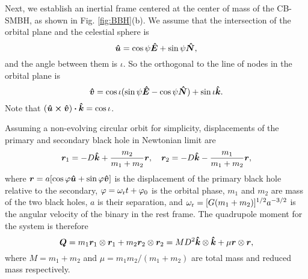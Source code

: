 \documentclass[times,tight]{aastex631}
\begin{document}
Next, we establish an inertial frame centered at the center of mass of the CB-SMBH, as shown in Fig. \ref{fig:BBH}(b).
We assume that the intersection of the orbital plane and the celestial sphere is
\begin{equation}
    \vu*{u} = \cos{\psi}\vu*{E} + \sin{\psi}\vu*{N},
\end{equation}
and the angle between them is $\iota$.
So the orthogonal to the line of nodes in the orbital plane is
\begin{equation}
    \vu*{v} = \cos \iota (\sin\psi\vu*{E} - \cos{\psi}\vu*{N}) + \sin \iota \vu*{k}.
\end{equation}
Note that $(\vu*{u} \cp \vu*{v})\vdot\vu*{k} = \cos\iota$.

Assuming a non-evolving circular orbit for simplicity, displacements of the primary and secondary black hole in Newtonian limit are
\begin{equation}
    \bm{r}_1 = -D \vu*{k} + \frac{m_2}{m_1+m_2} \bm{r} \qc \bm{r}_2 = -D \vu*{k} - \frac{m_1}{m_1+m_2} \bm{r},
\end{equation}
where $\bm{r} = a [\cos\varphi \vu*{u} + \sin\varphi \vu*{v}]$ is the displacement of the primary black hole relative to the secondary, $\varphi = \omega_{\rm r} t+\varphi_0$ is the orbital phase, $m_1$ and $m_2$ are mass of the two black holes, $a$ is their separation, and $\omega_{\rm r} = [G(m_1+m_2)]^{1/2}a^{-3/2}$ is the angular velocity of the binary in the rest frame.
The quadrupole moment for the system is therefore
\begin{equation}
    \bm{Q} = m_1 \bm{r}_1 \otimes \bm{r}_1 + m_2 \bm{r}_2 \otimes \bm{r}_2
    = MD^2 \vu*{k}\otimes\vu*{k} + \mu \bm{r}\otimes\bm{r},
\end{equation}
where $M=m_1+m_2$ and $\mu=m_1m_2/(m_1+m_2)$ are total mass and reduced mass respectively.
\end{document}
